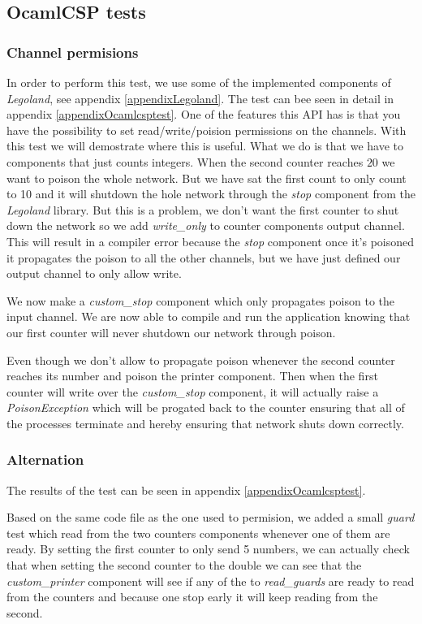 \documentclass[a4paper,12pt]{article}
\begin{document}
\subsection{OcamlCSP tests}
\label{ocamlcsptests}
\subsubsection{Channel permisions}
In order to perform this test, we use some of the implemented components
of {\it Legoland}, see appendix \ref{appendixLegoland}. The test can bee seen
in detail in appendix \ref{appendixOcamlcsptest}. One of the features this API
has is that you have the possibility to set read/write/poision permissions on
the channels. With this test we will demostrate where this is useful. What we
do is that we have to components that just counts integers. When the second
counter reaches $20$ we want to poison the whole network. But we have sat the
first count to only count to 10 and it will shutdown the hole network through
the {\it stop} component from the {\it Legoland} library. But this is a problem,
we don't want the first counter to shut down the network so we add
{\it write\_only} to counter components output channel. This will result in a
compiler error because the {\it stop} component once it's poisoned it propagates
the poison to all the other channels, but we have just defined our output
channel to only allow write.

We now make a {\it custom\_stop} component which only propagates poison to
the input channel. We are now able to compile and run the application knowing
that our first counter will never shutdown our network through poison.

Even though we don't allow to propagate poison whenever the second counter
reaches its number and poison the printer component. Then when the first
counter will write over the {\it custom\_stop} component, it will actually
raise a {\it PoisonException} which will be progated back to the counter
ensuring that all of the processes terminate and hereby ensuring that network
shuts down correctly.

\subsubsection{Alternation}
The results of the test can be seen in appendix \ref{appendixOcamlcsptest}.

Based on the same code file as the one used to permision, we added a small
{\it guard} test which read from the two counters components whenever one of
them are ready. By setting the first counter to only send 5 numbers, we can
actually check that when setting the second counter to the double we can see
that the {\it custom\_printer} component will see if any of the to
{\it read\_guards} are ready to read from the counters and because one stop
early it will keep reading from the second.
\end{document}
